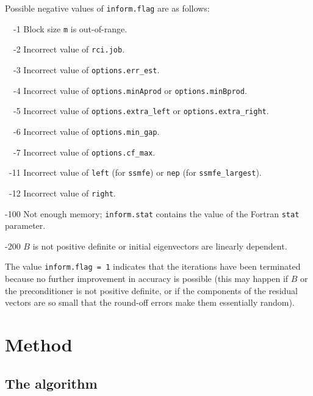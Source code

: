 Possible negative values of {\tt inform.flag}
are as follows:
%
\begin{description}
%
\item{~~-1}
\hskip 9pt
Block size {\tt m} is out-of-range.
%
\item{~~-2}
\hskip 9pt
Incorrect value of {\tt rci.job}. 
%
\item{~~-3}
\hskip 9pt
Incorrect value of {\tt options.err\_est}. 
%
\item{~~-4}
\hskip 9pt
Incorrect value of 
{\tt options.minAprod} or {\tt options.minBprod}.
%
\item{~~-5}
\hskip 9pt
Incorrect value of 
{\tt options.extra\_left} or
{\tt options.extra\_right}.
%
\item{~~-6}
\hskip 9pt
Incorrect value of {\tt options.min\_gap}. 
%
\item{~~-7}
\hskip 9pt
Incorrect value of {\tt options.cf\_max}. 
%
\item{~-11}
\hskip 7pt
Incorrect value of {\tt left} (for {\tt ssmfe})
or {\tt nep} (for {\tt ssmfe\_largest}).
%
\item{~-12}
\hskip 7pt
Incorrect value of {\tt right}. 
%
\item{-100}
\hskip 4pt
Not enough memory;
{\tt inform.stat} contains the value of the Fortran {\tt stat} parameter.
%
\item{-200}
\hskip 4pt
$B$ is not positive definite or initial eigenvectors are linearly dependent.
%
\end{description}

%
The value {\tt inform.flag = 1}
indicates that
the iterations have been terminated because no further improvement
in accuracy is possible (this may happen if $B$ or the preconditioner is
not positive definite, or if the components of the residual vectors
are so small that the round-off
errors make them essentially random).
%

\section{Method}
\label{ssmfe_core:method}

\subsection{The algorithm}


